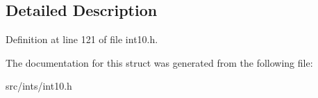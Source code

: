 \subsection{Detailed Description}


Definition at line 121 of file int10.\-h.



The documentation for this struct was generated from the following file\-:\begin{DoxyCompactItemize}
\item 
src/ints/int10.\-h\end{DoxyCompactItemize}
